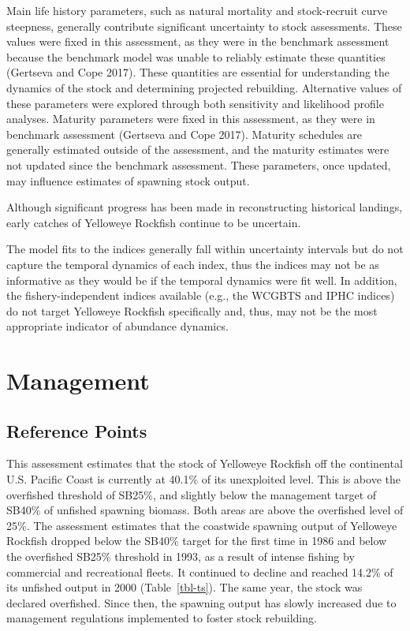 \documentclass[
]{scrartcl}
\begin{document}
Main life history parameters, such as natural mortality and
stock-recruit curve steepness, generally contribute significant
uncertainty to stock assessments. These values were fixed in this
assessment, as they were in the benchmark assessment because the
benchmark model was unable to reliably estimate these quantities
(Gertseva and Cope 2017). These quantities are essential for
understanding the dynamics of the stock and determining projected
rebuilding. Alternative values of these parameters were explored through
both sensitivity and likelihood profile analyses. Maturity parameters
were fixed in this assessment, as they were in benchmark assessment
(Gertseva and Cope 2017). Maturity schedules are generally estimated
outside of the assessment, and the maturity estimates were not updated
since the benchmark assessment. These parameters, once updated, may
influence estimates of spawning stock output.

Although significant progress has been made in reconstructing historical
landings, early catches of Yelloweye Rockfish continue to be uncertain.

The model fits to the indices generally fall within uncertainty
intervals but do not capture the temporal dynamics of each index, thus
the indices may not be as informative as they would be if the temporal
dynamics were fit well. In addition, the fishery-independent indices
available (e.g., the WCGBTS and IPHC indices) do not target Yelloweye
Rockfish specifically and, thus, may not be the most appropriate
indicator of abundance dynamics.

\newpage{}

\section{Management}\label{management}

\subsection{Reference Points}\label{reference-points-1}

This assessment estimates that the stock of Yelloweye Rockfish off the
continental U.S. Pacific Coast is currently at 40.1\% of its unexploited
level. This is above the overfished threshold of SB25\%, and slightly
below the management target of SB40\% of unfished spawning biomass. Both
areas are above the overfished level of 25\%. The assessment estimates
that the coastwide spawning output of Yelloweye Rockfish dropped below
the SB40\% target for the first time in 1986 and below the overfished
SB25\% threshold in 1993, as a result of intense fishing by commercial
and recreational fleets. It continued to decline and reached 14.2\% of
its unfished output in 2000 (Table~\ref{tbl-ts}). The same year, the
stock was declared overfished. Since then, the spawning output has
slowly increased due to management regulations implemented to foster
stock rebuilding.
\end{document}
